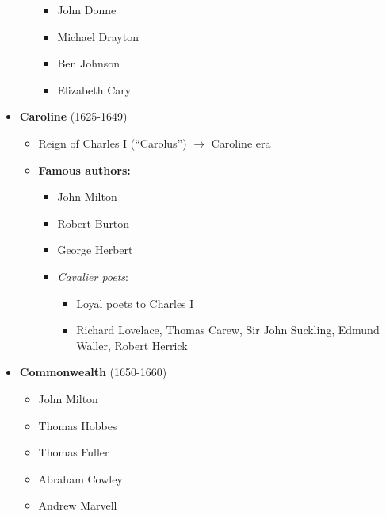 \documentclass[
  12pt,
    progressbar=frametitle]{beamer}
\providecommand{\tightlist}{%
  \setlength{\itemsep}{0pt}\setlength{\parskip}{0pt}}
\begin{document}
\begin{frame}[allowframebreaks]
\begin{itemize}
\begin{itemize}
    \begin{itemize}
    \tightlist
    \item
      John Donne
    \item
      Michael Drayton
    \item
      Ben Johnson
    \item
      Elizabeth Cary
    \end{itemize}
  \end{itemize}
\item
  \textbf{Caroline} (1625-1649)

  \begin{itemize}
  \tightlist
  \item
    Reign of Charles I (``Carolus'') \(\rightarrow\) Caroline era
  \item
    \textbf{Famous authors:}

    \begin{itemize}
    \tightlist
    \item
      John Milton
    \item
      Robert Burton
    \item
      George Herbert
    \item
      \emph{Cavalier poets}:

      \begin{itemize}
      \tightlist
      \item
        Loyal poets to Charles I
      \item
        Richard Lovelace, Thomas Carew, Sir John Suckling, Edmund
        Waller, Robert Herrick
      \end{itemize}
    \end{itemize}
  \end{itemize}
\item
  \textbf{Commonwealth} (1650-1660)

  \begin{itemize}
  \tightlist
  \item
    John Milton
  \item
    Thomas Hobbes
  \item
    Thomas Fuller
  \item
    Abraham Cowley
  \item
    Andrew Marvell
  \end{itemize}
\end{itemize}
\end{frame}
\end{document}
